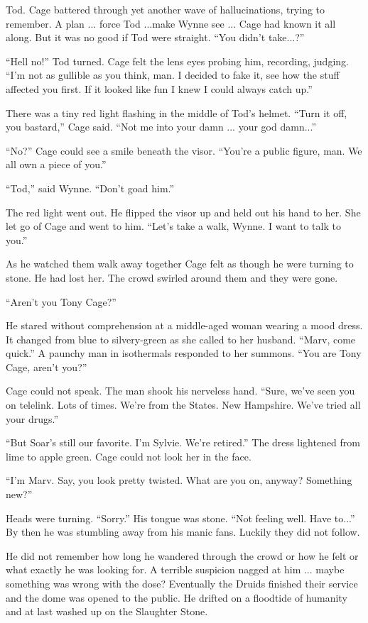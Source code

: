 Tod. Cage battered through yet another wave of hallucinations, trying to remember. A plan ... force Tod ...make Wynne see ... Cage had known it all along. But it was no good if Tod were straight. ``You didn't take...?''

``Hell no!'' Tod turned. Cage felt the lens eyes probing him, recording, judging. ``I'm not as gullible as you think, man. I decided to fake it, see how the stuff affected you first. If it looked like fun I knew I could always catch up.''

There was a tiny red light flashing in the middle of Tod's helmet. ``Turn it off, you bastard,'' Cage said. ``Not me into your damn ... your god damn...''

``No?'' Cage could see a smile beneath the visor. ``You're a public figure, man. We all own a piece of you.''

``Tod,'' said Wynne. ``Don't goad him.''

The red light went out. He flipped the visor up and held out his hand to her. She let go of Cage and went to him. ``Let's take a walk, Wynne. I want to talk to you.''

As he watched them walk away together Cage felt as though he were turning to stone. He had lost her. The crowd swirled around them and they were gone.

``Aren't you Tony Cage?''

He stared without comprehension at a middle-aged woman wearing a mood dress. It changed from blue to silvery-green as she called to her husband. ``Marv, come quick.'' A paunchy man in isothermals responded to her summons. ``You are Tony Cage, aren't you?''

Cage could not speak. The man shook his nerveless hand. ``Sure, we've seen you on telelink. Lots of times. We're from the States. New Hampshire. We've tried all your drugs.''

``But Soar's still our favorite. I'm Sylvie. We're retired.'' The dress lightened from lime to apple green. Cage could not look her in the face.

``I'm Marv. Say, you look pretty twisted. What are you on, anyway? Something new?''

Heads were turning. ``Sorry.'' His tongue was stone. ``Not feeling well. Have to...'' By then he was stumbling away from his manic fans. Luckily they did not follow.

He did not remember how long he wandered through the crowd or how he felt or what exactly he was looking for. A terrible suspicion nagged at him ... maybe something was wrong with the dose? Eventually the Druids finished their service and the dome was opened to the public. He drifted on a floodtide of humanity and at last washed up on the Slaughter Stone.

